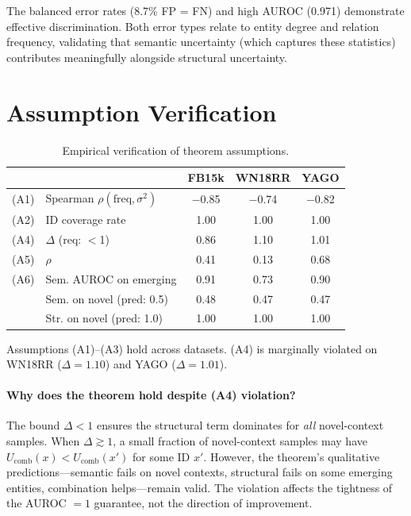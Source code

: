 \documentclass[accepted]{uai2024}  %
\begin{document}
The balanced error rates (8.7\% FP = FN) and high AUROC (0.971) demonstrate effective discrimination.
Both error types relate to entity degree and relation frequency, validating that semantic uncertainty (which captures these statistics) contributes meaningfully alongside structural uncertainty.

\section{Assumption Verification}
\label{app:assumptions}

\begin{table}[h]
\centering
\caption{Empirical verification of theorem assumptions.}
\label{tab:assumptions}
\small
\begin{tabular}{llccc}
\toprule
 & & FB15k & WN18RR & YAGO \\
\midrule
(A1) & Spearman $\rho(\text{freq}, \sigma^2)$ & $-$0.85 & $-$0.74 & $-$0.82 \\
(A2) & ID coverage rate & 1.00 & 1.00 & 1.00 \\
(A4) & $\Delta$ (req: $<$1) & 0.86 & 1.10 & 1.01 \\
(A5) & $\rho$ & 0.41 & 0.13 & 0.68 \\
(A6) & Sem. AUROC on emerging & 0.91 & 0.73 & 0.90 \\
\midrule
& Sem. on novel (pred: 0.5) & 0.48 & 0.47 & 0.47 \\
& Str. on novel (pred: 1.0) & 1.00 & 1.00 & 1.00 \\
\bottomrule
\end{tabular}
\end{table}

Assumptions (A1)--(A3) hold across datasets. (A4) is marginally violated on WN18RR ($\Delta=1.10$) and YAGO ($\Delta=1.01$).

\paragraph{Why does the theorem hold despite (A4) violation?}
The bound $\Delta < 1$ ensures the structural term dominates for \emph{all} novel-context samples. When $\Delta \gtrsim 1$, a small fraction of novel-context samples may have $U_{\text{comb}}(x) < U_{\text{comb}}(x')$ for some ID $x'$. However, the theorem's qualitative predictions---semantic fails on novel contexts, structural fails on some emerging entities, combination helps---remain valid. The violation affects the tightness of the AUROC $= 1$ guarantee, not the direction of improvement.
\end{document}
